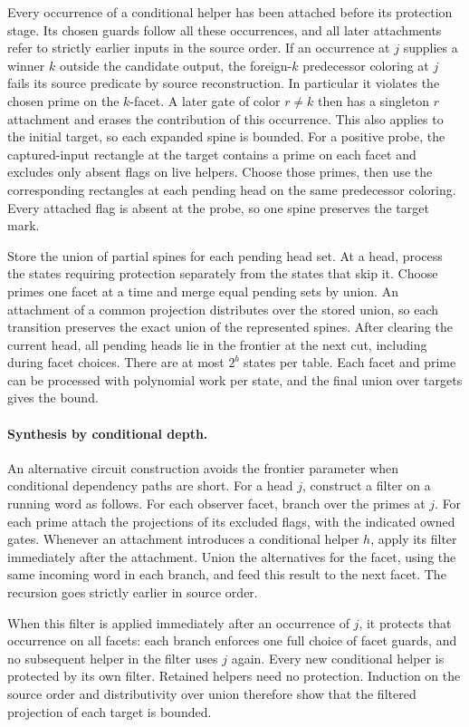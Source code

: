 Every occurrence of a conditional helper has been
attached before its protection stage. Its chosen
guards follow all these occurrences, and all later
attachments refer to strictly earlier inputs in the
source order. If an occurrence at $j$ supplies a winner $k$ outside
the candidate output, the foreign-$k$ predecessor
coloring at $j$ fails its source predicate by source
reconstruction. In particular it violates the chosen
prime on the $k$-facet. A later gate of color $r\ne k$
then has a singleton $r$ attachment and erases the
contribution of this occurrence. This also applies
to the initial target, so each expanded spine is
bounded.
For a positive probe, the captured-input rectangle
at the target contains a prime on each facet and
excludes only absent flags on live helpers.
Choose those primes, then use the corresponding
rectangles at each pending head on the same
predecessor coloring. Every attached flag is absent
at the probe, so one spine preserves the target mark.

Store the union of partial spines for each pending
head set. At a head, process the states requiring
protection separately from the states that skip it.
Choose primes one facet at a time and merge equal
pending sets by union. An attachment of a common
projection distributes over the stored union, so
each transition preserves the exact union of the
represented spines. After clearing the current head,
all pending heads lie in the frontier at the next
cut, including during facet choices. There are at
most $2^b$ states per table. Each facet and prime
can be processed with polynomial work per state,
and the final union over targets gives the bound.

\paragraph{Synthesis by conditional depth.}
An alternative circuit construction
avoids the frontier parameter when
conditional dependency paths are
short. For a head $j$, construct a
filter on a running word as follows.
For each observer facet, branch
over the primes at $j$. For each
prime attach the projections of its
excluded flags, with the indicated
owned gates. Whenever an attachment
introduces a conditional helper $h$,
apply its filter immediately after
the attachment. Union the alternatives
for the facet, using the same incoming
word in each branch, and feed this
result to the next facet. The recursion
goes strictly earlier in source order.

When this filter is applied immediately
after an occurrence of $j$, it protects
that occurrence on all facets: each
branch enforces one full choice of
facet guards, and no subsequent helper
in the filter uses $j$ again. Every
new conditional helper is protected
by its own filter. Retained helpers
need no protection. Induction on the
source order and distributivity over
union therefore show that the filtered
projection of each target is bounded.

